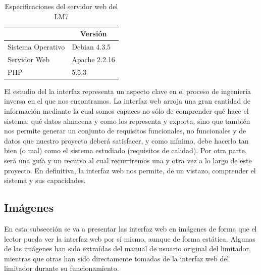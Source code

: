 \begin{table}[h]
    \centering
    \begin{tabular}{|l|l|}
        \hline
        \rowcolor[HTML]{ECF4FF}
        \multicolumn{1}{|c|}{\cellcolor[HTML]{ECF4FF}\textbf{Tecnología}} & \multicolumn{1}{c|}{\cellcolor[HTML]{ECF4FF}\textbf{Versión}} \\ \hline
        Sistema Operativo                                                 & Debian 4.3.5                                                  \\ \hline
        Servidor Web                                                      & Apache 2.2.16                                                 \\ \hline
        PHP                                                               & 5.5.3                                                         \\ \hline
    \end{tabular}
    \caption{Especificaciones del servidor web del \gls{LM7}}
    \label{tab:lm7_lamp_specs}
\end{table}

El estudio del la interfaz representa un aspecto clave en el proceso de ingeniería inversa en el que nos encontramos. La interfaz web arroja una gran cantidad de información mediante la cual somos capaces no sólo de comprender qué hace el sistema, qué datos almacena y como los representa y exporta, sino que también nos permite generar un conjunto de requisitos funcionales, no funcionales y de datos que nuestro proyecto deberá satisfacer, y como mínimo, debe hacerlo tan bien (o mal) como el sistema estudiado (requisitos de calidad). Por otra parte, será una guía y un recurso al cual recurriremos una y otra vez a lo largo de este proyecto. En definitiva, la interfaz web nos permite, de un vistazo, comprender el sistema y sus capacidades.

\subsection{Imágenes}

En esta subsección se va a presentar las interfaz web en imágenes de forma que el lector pueda ver la interfaz web por sí mismo, aunque de forma estática. Algunas de las imágenes han sido extraídas del manual de usuario original del limitador, mientras que otras han sido directamente tomadas de la interfaz web del limitador durante su funcionamiento.

